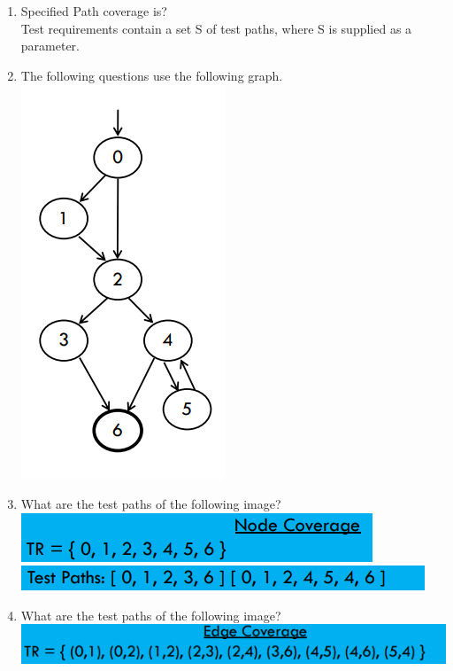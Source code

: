 \documentclass[10pt]{article}
\begin{document}
\begin{enumerate}
      \item Specified Path coverage is?\\
            Test requirements contain a set S of test paths, where S is supplied as a parameter.\\
      \item The following questions use the following graph.\\
            \includegraphics*[scale=.5]{graph1.png}\\
      \item What are the test paths of the following image?\\
            \includegraphics*[scale=.5]{nodec.png}\\
            \includegraphics*[scale=.5]{nodectp.png}\\
      \item What are the test paths of the following image?\\
            \includegraphics*[scale=.5]{edgec.png}\\

\end{enumerate}
\end{document}
